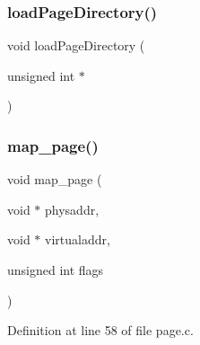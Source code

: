 \subsubsection{\texorpdfstring{load\+Page\+Directory()}{loadPageDirectory()}}
{\footnotesize\ttfamily void load\+Page\+Directory (\begin{DoxyParamCaption}\item[{unsigned int $\ast$}]{ }\end{DoxyParamCaption})}

\mbox{\label{a00086_adf8c9211327b122b455fabf292cc2411_adf8c9211327b122b455fabf292cc2411}} 
\subsubsection{\texorpdfstring{map\+\_\+page()}{map\_page()}}
{\footnotesize\ttfamily void map\+\_\+page (\begin{DoxyParamCaption}\item[{void $\ast$}]{physaddr,  }\item[{void $\ast$}]{virtualaddr,  }\item[{unsigned int}]{flags }\end{DoxyParamCaption})}



Definition at line 58 of file page.\+c.


